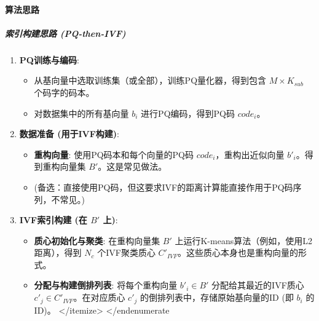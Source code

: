 \documentclass[a4paper]{article}
\begin{document}
	\paragraph{算法思路}
	\subparagraph{索引构建思路 (PQ-then-IVF)}
	\begin{enumerate}
		\item \textbf{PQ训练与编码}:
		\begin{itemize}
			\item 从基向量中选取训练集（或全部），训练PQ量化器，得到包含 $M \times K_{sub}$ 个码字的码本。
			\item 对数据集中的所有基向量 $b_i$ 进行PQ编码，得到PQ码 $code_i$。
		\end{itemize}
		\item \textbf{数据准备 (用于IVF构建)}:
		\begin{itemize}
			\item \textbf{重构向量}: 使用PQ码本和每个向量的PQ码 $code_i$，重构出近似向量 $b'_i$。得到重构向量集 $B'$。这是常见做法。
			\item (备选：直接使用PQ码，但这要求IVF的距离计算能直接作用于PQ码序列，不常见。)
		\end{itemize}
		\item \textbf{IVF索引构建 (在 $B'$ 上)}:
		\begin{itemize}
			\item \textbf{质心初始化与聚类}: 在重构向量集 $B'$ 上运行K-means算法（例如，使用L2距离），得到 $N_c$ 个IVF聚类质心 $C'_{IVF}$。这些质心本身也是重构向量的形式。
			\item \textbf{分配与构建倒排列表}: 将每个重构向量 $b'_i \in B'$ 分配给其最近的IVF质心 $c'_j \in C'_{IVF}$。在对应质心 $c'_j$ 的倒排列表中，存储原始基向量的ID (即 $b_i$ 的ID)。
		</itemize>
	</end{enumerate}
	

\end{itemize}
\end{enumerate}
\end{document}
